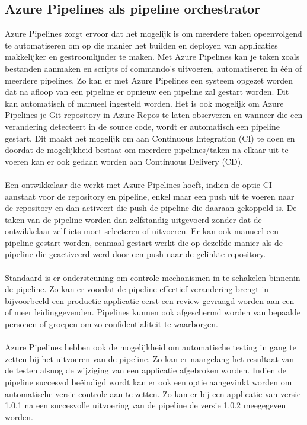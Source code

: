 \subsection{Azure Pipelines als pipeline orchestrator}
Azure Pipelines zorgt ervoor dat het mogelijk is om meerdere taken opeenvolgend te automatiseren om op die manier het builden en deployen van applicaties makkelijker en gestroomlijnder te maken. Met Azure Pipelines kan je taken zoals bestanden aanmaken en scripts of commando's uitvoeren, automatiseren in één of meerdere pipelines. Zo kan er met Azure Pipelines een systeem opgezet worden dat na afloop van een pipeline er opnieuw een pipeline zal gestart worden. Dit kan automatisch of manueel ingesteld worden. Het is ook mogelijk om Azure Pipelines je Git repository in Azure Repos te laten observeren en wanneer die een verandering detecteert in de source code, wordt er automatisch een pipeline gestart. Dit maakt het mogelijk om aan Continuous Integration (CI) te doen en doordat de mogelijkheid bestaat om meerdere pipelines/taken na elkaar uit te voeren kan er ook gedaan worden aan Continuous Delivery (CD). \autocite{Microsoft2023}
\\ \\
Een ontwikkelaar die werkt met Azure Pipelines hoeft, indien de optie CI aanstaat voor de repository en pipeline, enkel maar een push uit te voeren naar de repository en dan activeert die push de pipeline die daaraan gekoppeld is. De taken van de pipeline worden dan zelfstandig uitgevoerd zonder dat de ontwikkelaar zelf iets moet selecteren of uitvoeren. Er kan ook manueel een pipeline gestart worden, eenmaal gestart werkt die op dezelfde manier als de pipeline die geactiveerd werd door een push naar de gelinkte repository. \autocite{Microsoft2023}
\\ \\
Standaard is er ondersteuning om controle mechanismen in te schakelen binnenin de pipeline. Zo kan er voordat de pipeline effectief verandering brengt in bijvoorbeeld een productie applicatie eerst een review gevraagd worden aan een of meer leidinggevenden. Pipelines kunnen ook afgeschermd worden van bepaalde personen of groepen om zo confidentialiteit te waarborgen. \autocite{Microsoft2023}
\\ \\
Azure Pipelines hebben ook de mogelijkheid om automatische testing in gang te zetten bij het uitvoeren van de pipeline. Zo kan er naargelang het resultaat van de testen alsnog de wijziging van een applicatie afgebroken worden. Indien de pipeline succesvol beëindigd wordt kan er ook een optie aangevinkt worden om automatische versie controle aan te zetten. Zo kan er bij een applicatie van versie 1.0.1 na een succesvolle uitvoering van de pipeline de versie 1.0.2 meegegeven worden. \autocite{Microsoft2023}
\\ \\ \\ \\ \\ \\
